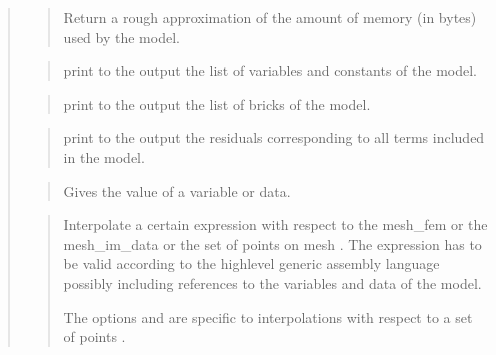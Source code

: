\documentclass[a4paper,11pt,english]{sphinxmanual}
\begin{document}
\begin{quote}
\begin{quote}

Return a rough approximation of the amount of memory (in bytes) used by
the model.
\end{quote}

\begin{quote}

print to the output the list of variables and constants of the model.
\end{quote}

\begin{quote}

print to the output the list of bricks of the model.
\end{quote}

\begin{quote}

print to the output the residuals corresponding to all terms
included in the model.
\end{quote}

\begin{quote}

Gives the value of a variable or data.
\end{quote}

\begin{quote}

Interpolate a certain expression with respect to the mesh\_fem 
or the mesh\_im\_data  or the set of points  on mesh .
The expression has to be valid according to the high\sphinxhyphen{}level generic
assembly language possibly including references to the variables
and data of the model.

The options  and  are specific to
interpolations with respect to a set of points .
\end{quote}


\end{quote}
\end{document}
